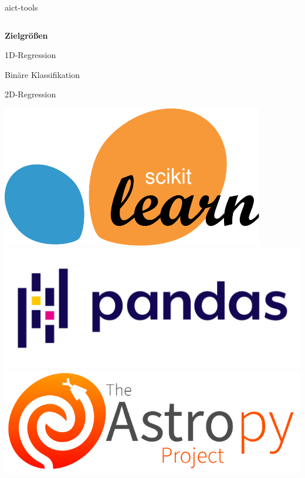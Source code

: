 \documentclass[aspectratio=1610, 9pt]{beamer}
\begin{document}
\begin{frame}[c]{aict-tools}
  \begin{columns}[onlytextwidth, c]
    \begin{column}{0.65\textwidth}
      {\large\bfseries Zielgrößen}
      \begin{description}[Teilchenklasse]
        \item[Energie] 1D-Regression
        \item[Teilchenklasse] Binäre Klassifikation
        \item[Herkunft] 2D-Regression
      \end{description}

      \begin{center}
        \includegraphics[height=0.2\textheight]{images/scikit-learn.pdf}\hspace{2em}%
        \includegraphics[height=0.2\textheight]{images/pandas.pdf}\\[0.5\baselineskip]
        \includegraphics[height=0.2\textheight]{images/astropy.pdf}

\end{center}
\end{column}
\end{columns}
\end{frame}
\end{document}
